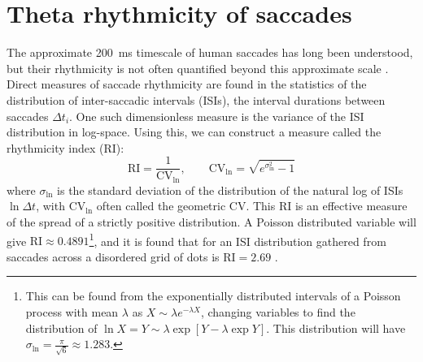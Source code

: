 \section{Theta rhythmicity of saccades}\label{sec:theta_rhythmicity_of_saccades}
The approximate \qty{200}{\ms} timescale of human saccades has long been understood, but their rhythmicity is not often quantified beyond this approximate scale \cite{meyer_rhythmicity_1966, saccadic_rhythm_1986, chota_rhythmic_2018, shaverdi_orchestration_2023}. Direct measures of saccade rhythmicity are found in the statistics of the distribution of inter-saccadic intervals (ISIs), the interval durations between saccades $\Delta t_i$. One such dimensionless measure is the variance of the ISI distribution in log-space. Using this, we can construct a measure called the rhythmicity index (RI):
\begin{equation}
	\text{RI} = \frac{1}{\text{CV}_{\ln}}, \qquad \text{CV}_{\ln} = \sqrt{e^{\sigma_{\ln}^2} - 1}
\end{equation}
where $\sigma_{\ln}$ is the standard deviation of the distribution of the natural log of ISIs $\ln \Delta t$, with $\text{CV}_{\ln}$ often called the geometric CV. This $\text{RI}$ is an effective measure of the spread of a strictly positive distribution. A Poisson distributed variable will give $\text{RI}\approx 0.4891$\footnote{This can be found from the exponentially distributed intervals of a Poisson process with mean $\lambda$ as $X \sim \lambda e^{-\lambda X}$, changing variables to find the distribution of $\ln X = Y \sim \lambda \exp[ Y - \lambda \exp Y ]$. This distribution will have $\sigma_{\ln} = \frac{\pi}{\sqrt{6}} \approx 1.283$.}, and it is found that for an ISI distribution gathered from saccades across a disordered grid of dots is $\text{RI} = 2.69$ \cite{naher_primate_saccades}.

